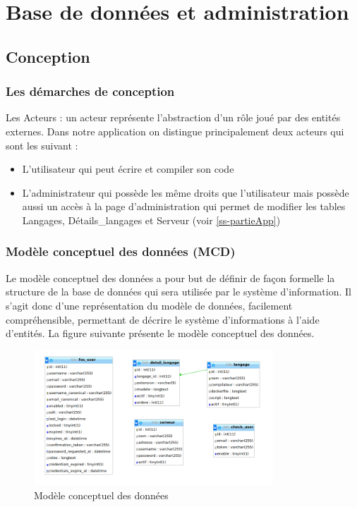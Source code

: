 \chapter{Base de données et administration}
\label{ch-bdd-admin}


\section{Conception}

\subsection{Les démarches de conception}

\par Les Acteurs : un acteur représente l’abstraction d’un rôle joué par des entités externes. Dans notre application on distingue principalement deux acteurs qui sont les suivant :

\begin{itemize}
\item L'utilisateur qui peut écrire et compiler son code
\item L'administrateur qui possède les même droits que l'utilisateur mais possède aussi un accès à la page d'administration qui permet de modifier les tables Langages, Détails\_langages et Serveur (voir \ref{ss-partieApp})
\end{itemize}

\subsection{Modèle conceptuel des données (MCD)}
 
\par Le modèle conceptuel des données a pour but de définir de façon formelle la structure de la base de données qui sera utilisée par le système d'information. Il s'agit donc d'une représentation du modèle de données, facilement compréhensible, permettant de décrire le système d'informations à l'aide d'entités. 
La figure suivante présente le modèle conceptuel des données.

\begin{figure}[H]
\centering
\includegraphics[width=0.8\textwidth]{./img/bdd/bdd.png}
\caption{Modèle conceptuel des données}
\end{figure}

